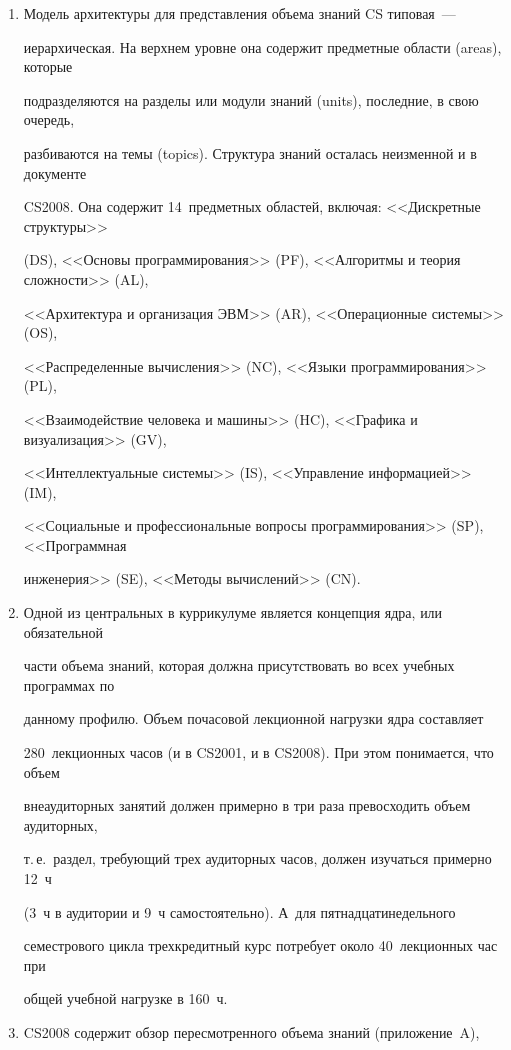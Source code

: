 \begin{enumerate}[1.]

\item  Модель архитектуры для представления объема знаний CS типовая~--- 

иерархическая. На верхнем уровне она содержит предметные области (areas), которые 

подразделяются на разделы или модули знаний (units), последние, в свою очередь, 

разбиваются на темы (topics). Структура знаний осталась неизменной и в документе 

CS2008. Она содержит 14~предметных областей, включая: <<Дискретные структуры>> 

(DS), <<Основы программирования>> (PF), <<Алгоритмы и теория сложности>> (AL), 

<<Архитектура и организация ЭВМ>> (AR), <<Операционные системы>> (OS), 

<<Распределенные вычисления>> (NC), <<Языки программирования>> (PL), 

<<Взаимодействие человека и машины>> (HC), <<Графика и визуализация>> (GV), 

<<Интеллектуальные системы>> (IS), <<Управление информацией>> (IM), 

<<Социальные и профессиональные вопросы программирования>> (SP), <<Программная 

инженерия>> (SE), <<Методы вычислений>> (CN). 

\item  Одной из центральных в куррикулуме является концепция ядра, или обязательной 

час\-ти объема знаний, которая должна присутствовать во всех учебных программах по 

данному профилю. Объем почасовой лекционной нагрузки ядра составляет 

280~лекционных часов (и в CS2001, и в CS2008). При этом понимается, что объем 

внеаудиторных занятий должен примерно в три раза превосходить объем аудиторных,

т.\,е.\ раздел, требующий трех аудиторных часов, должен изучаться примерно 12~ч 

(3~ч в аудитории и 9~ч самостоятельно). А~для пятнадцатинедельного 

семестрового цикла трехкредитный курс потребует около 40~лекционных час при 

общей учебной нагрузке в 160~ч.

\item  CS2008 содержит обзор пересмотренного объема знаний (приложение~A), 


\end{enumerate}
